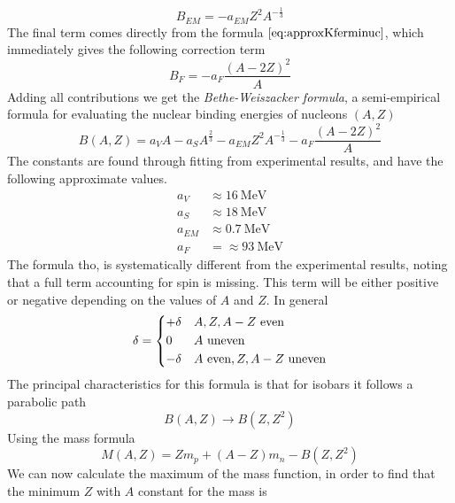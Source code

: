 \documentclass[../qm.tex]{subfiles}
\begin{document}
\begin{equation*}
	B_{EM}=-a_{EM}Z^2A^{-\frac{1}{3}}
\end{equation*}
The final term comes directly from the formula $\eqref{eq:approxKferminuc}$, which immediately gives the following correction term
\begin{equation*}
	B_F=-a_F\frac{\left( A-2Z \right)^2}{A}
\end{equation*}
Adding all contributions we get the \emph{Bethe-Weiszacker formula}, a semi-empirical formula for evaluating the nuclear binding energies of nucleons $(A,Z)$
\begin{equation}
	B(A,Z)=a_VA-a_SA^{\frac{2}{3}}-a_{EM}Z^2A^{-\frac{1}{3}}-a_F\frac{\left( A-2Z \right)^2}{A}
	\label{eq:betheweiszacker}
\end{equation}
The constants are found through fitting from experimental results, and have the following approximate values.\\
\begin{equation*}
	\begin{aligned}
		a_V&\approx16\ \mathrm{MeV}\\
		a_S&\approx18\ \mathrm{MeV}\\
		a_{EM}&\approx0.7\ \mathrm{MeV}\\
		a_F&=\approx93\ \mathrm{MeV}
	\end{aligned}
\end{equation*}
The formula tho, is systematically different from the experimental results, noting that a full term accounting for spin is missing. This term will be either positive or negative depending on the values of $A$ and $Z$. In general
\begin{equation*}
	\delta=\begin{dcases}+\delta&A,Z,A-Z\text{ even}\\0&A\text{ uneven}\\-\delta&A\text{ even},Z,A-Z\text{ uneven}\end{dcases}
\end{equation*}
The principal characteristics for this formula is that for isobars it follows a parabolic path
\begin{equation*}
	B(A,Z)\to B(Z,Z^2)
\end{equation*}
Using the mass formula
\begin{equation*}
	M(A,Z)=Zm_p+(A-Z)m_n-B(Z,Z^2)
\end{equation*}
We can now calculate the maximum of the mass function, in order to find that the minimum $Z$ with $A$ constant for the mass is
\end{document}
